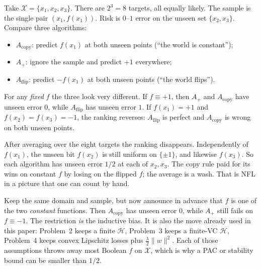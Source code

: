 \begin{example}
\label{exmp:mlu-nfl-three}
Take $\mathcal{X}=\{x_1,x_2,x_3\}$. There are $2^3=8$ targets, all equally likely. The sample is the single pair $(x_1,f(x_1))$. Risk is $0$--$1$ error on the unseen set $\{x_2,x_3\}$. Compare three algorithms:
\begin{itemize}
    \item $A_{\mathrm{copy}}$: predict $f(x_1)$ at both unseen points (``the world is constant'');
    \item $A_{+}$: ignore the sample and predict $+1$ everywhere;
    \item $A_{\mathrm{flip}}$: predict $-f(x_1)$ at both unseen points (``the world flips'').
\end{itemize}
For any \emph{fixed} $f$ the three look very different. If $f\equiv +1$, then $A_{+}$ and $A_{\mathrm{copy}}$ have unseen error $0$, while $A_{\mathrm{flip}}$ has unseen error $1$. If $f(x_1)=+1$ and $f(x_2)=f(x_3)=-1$, the ranking reverses: $A_{\mathrm{flip}}$ is perfect and $A_{\mathrm{copy}}$ is wrong on both unseen points.

After averaging over the eight targets the ranking disappears. Independently of $f(x_1)$, the unseen bit $f(x_2)$ is still uniform on $\{\pm 1\}$, and likewise $f(x_3)$. So each algorithm has unseen error $1/2$ at each of $x_2,x_3$. The copy rule paid for its wins on constant $f$ by losing on the flipped $f$; the average is a wash. That is NFL in a picture that one can count by hand.
\end{example}

\begin{example}
\label{exmp:mlu-nfl-restrict}
Keep the same domain and sample, but now announce in advance that $f$ is one of the two \emph{constant} functions. Then $A_{\mathrm{copy}}$ has unseen error $0$, while $A_{+}$ still fails on $f\equiv -1$. The restriction \emph{is} the inductive bias. It is also the move already used in this paper: Problem~2 keeps a finite $\mathcal{H}$, Problem~3 keeps a finite-VC $\mathcal{H}$, Problem~4 keeps convex Lipschitz losses plus $\tfrac{\lambda}{2}\lVert w\rVert^2$. Each of those assumptions throws away most Boolean $f$ on $\mathcal{X}$, which is why a PAC or stability bound can be smaller than $1/2$.
\end{example}

